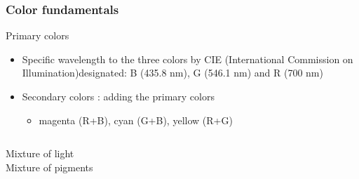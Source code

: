 \documentclass{beamer}
\begin{document}
\begin{frame}
\frametitle{Color fundamentals}
\begin{block}{Primary colors}
\begin{itemize}
	\item Specific wavelength to the three colors by CIE (International Commission on Illumination)designated: B (435.8 nm), G (546.1 nm) and R (700 nm)
	\item Secondary colors : adding the primary colors
	\begin{itemize}
	\item magenta (R+B), cyan (G+B), yellow (R+G)
	\end{itemize}
\end{itemize}
\begin{columns}
Mixture of light\\	
Mixture of pigments\\	
\end{columns}
\end{block}
\end{frame}
\end{document}
